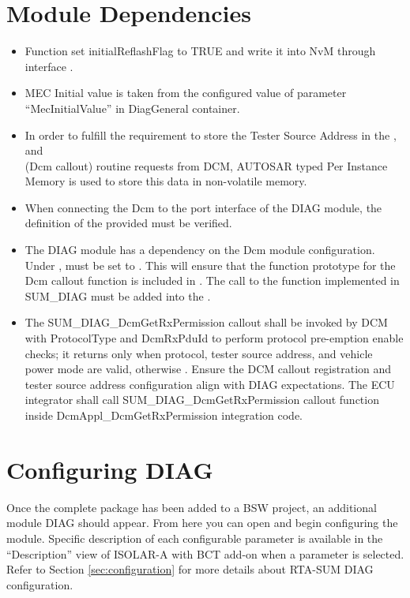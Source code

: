 \section{Module Dependencies}
\label{sec:dependencies}
\begin{itemize}
	\item Function  set initialReflashFlag to TRUE and write it into NvM through interface .
	\item MEC Initial value is taken from the configured value of parameter “MecInitialValue” in DiagGeneral container.
	\item In order to fulfill the requirement to store the Tester Source Address in the \break{},  and  \\ (Dcm callout) routine requests from DCM, AUTOSAR typed Per Instance Memory is used to store this data in non-volatile memory.
	\item When connecting the Dcm to the port interface \break{} of the DIAG module, the definition of the provided   must be verified.
	\item The DIAG module has a dependency on the Dcm module configuration. \\
	Under ,  must be set to .	
	This will ensure that the function prototype for the Dcm callout function  is included in .
	The call to the function  implemented in SUM\_DIAG must be added into the .
	\item The SUM\_DIAG\_DcmGetRxPermission callout shall be invoked by DCM with ProtocolType and DcmRxPduId to perform protocol pre-emption enable checks; it returns  only when protocol, tester source address, and vehicle power mode are valid, otherwise . Ensure the DCM callout registration and tester source address configuration align with DIAG expectations. The ECU integrator shall call SUM\_DIAG\_DcmGetRxPermission callout function inside DcmAppl\_DcmGetRxPermission integration code.

\end{itemize}

\section{Configuring DIAG}
Once the complete package has been added to a BSW project, an additional module DIAG should appear.
From here you can open and begin configuring the module.
Specific description of each configurable parameter is available in the “Description” view of
\ifnum {}
\else
{ISOLAR-A with BCT add-on}
\fi
when a parameter is selected. \\
Refer to Section \ref{sec:configuration} for more details about RTA-SUM DIAG configuration.

